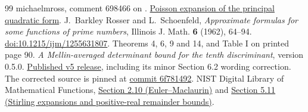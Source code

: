 \documentclass[11pt]{article}
\begin{document}
\begin{thebibliography}{99}
 michaelmross, comment 698466 on \cite{tao}.
\href{https://terrytao.wordpress.com/2026/10/20/an-experimental-ai-math-challenge-using-tenth-discriminant-bounds-to-explore-arguments-ruling-out-siegel-zeroes/\#comment-698466}{Poisson expansion of the principal quadratic form}.
 J.~Barkley Rosser and L.~Schoenfeld,
\emph{Approximate formulas for some functions of prime numbers},
Illinois J. Math. \textbf{6} (1962), 64--94.
\href{https://doi.org/10.1215/ijm/1255631807}{doi:10.1215/ijm/1255631807}.
Theorems 4, 6, 9 and 14, and Table I on printed page 90.
 \emph{A Mellin-averaged determinant bound for the tenth
discriminant}, version 0.5.0.
\href{https://github.com/twinheterodox/tenth-discriminant/releases/tag/v0.5.0}{Published v5 release},
including its minor Section 6.2 wording correction.
The corrected source is pinned at
\href{https://github.com/twinheterodox/tenth-discriminant/tree/6f781492afd06de32997c2c89d4e228a78bab7fc/versions/v5}{commit 6f781492}.
 NIST Digital Library of Mathematical Functions,
\href{https://dlmf.nist.gov/2.10}{Section 2.10 (Euler--Maclaurin)} and
\href{https://dlmf.nist.gov/5.11}{Section 5.11 (Stirling expansions
and positive-real remainder bounds)}.
\end{thebibliography}
\end{document}
